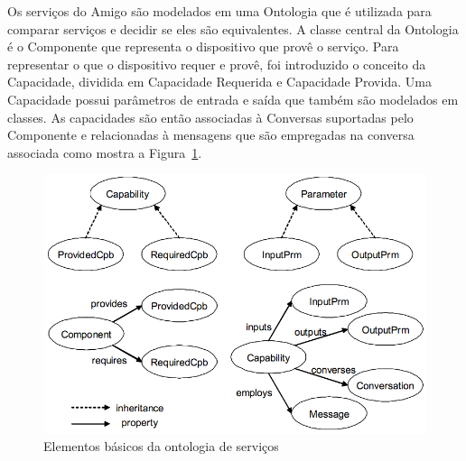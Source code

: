 Os serviços do Amigo são modelados em uma Ontologia que é utilizada para comparar serviços e decidir se eles são equivalentes. A classe central da Ontologia é o Componente que representa o dispositivo que provê o serviço. Para representar o que o dispositivo requer e provê, foi introduzido o conceito da Capacidade, dividida em Capacidade Requerida e Capacidade Provida. Uma Capacidade possui parâmetros de entrada e saída que também são modelados em classes. As capacidades são então associadas à Conversas suportadas pelo Componente e relacionadas à mensagens que são empregadas na conversa associada como mostra a Figura~\ref{fig:amigoServiceOntology}.

\begin{figure}[ht]
\center
\includegraphics[scale=0.5]{imagens/amigo-ontology}
\caption{Elementos básicos da ontologia de serviços}
\label{fig:amigoServiceOntology}
\end{figure}

